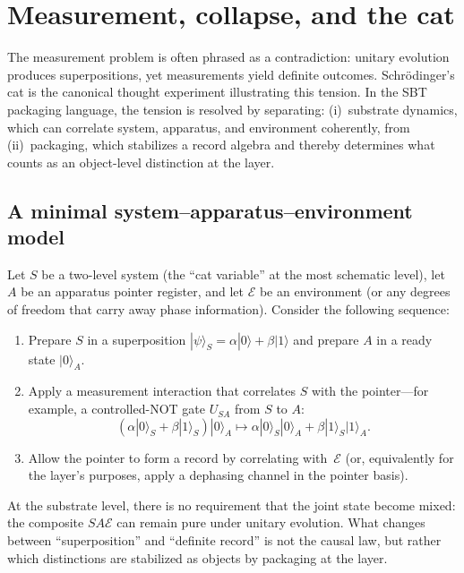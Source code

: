 \section{Measurement, collapse, and the cat}\label{sec:cat}

The measurement problem is often phrased as a contradiction: unitary evolution produces superpositions, yet measurements yield definite outcomes.
Schr{\"o}dinger's cat is the canonical thought experiment illustrating this tension.\cite{Schrodinger1935PresentSituation}
In the SBT packaging language, the tension is resolved by separating:
(i)~substrate dynamics, which can correlate system, apparatus, and environment coherently, from
(ii)~packaging, which stabilizes a record algebra and thereby determines what counts as an object-level distinction at the layer.

\subsection{A minimal system--apparatus--environment model}

Let $S$ be a two-level system (the ``cat variable'' at the most schematic level), let $A$ be an apparatus pointer register, and let $\mathcal{E}$ be an environment (or any degrees of freedom that carry away phase information).
Consider the following sequence:
\begin{enumerate}
  \item Prepare $S$ in a superposition $|\psi\rangle_S = \alpha|0\rangle + \beta|1\rangle$ and prepare $A$ in a ready state $|0\rangle_A$.
  \item Apply a measurement interaction that correlates $S$ with the pointer---for example, a controlled-NOT gate $U_{SA}$ from $S$ to $A$:
  \[
  (\alpha|0\rangle_S+\beta|1\rangle_S)|0\rangle_A \mapsto \alpha|0\rangle_S|0\rangle_A + \beta|1\rangle_S|1\rangle_A.
  \]
  \item Allow the pointer to form a record by correlating with~$\mathcal{E}$ (or, equivalently for the layer's purposes, apply a dephasing channel in the pointer basis).
\end{enumerate}

At the substrate level, there is no requirement that the joint state become mixed: the composite $SA\mathcal{E}$ can remain pure under unitary evolution.
What changes between ``superposition'' and ``definite record'' is not the causal law, but rather which distinctions are stabilized as objects by packaging at the layer.

